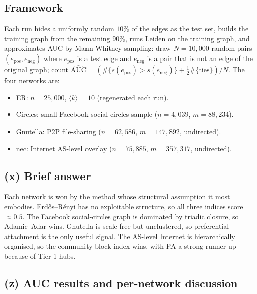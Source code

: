 \documentclass[12pt]{article}
\theoremstyle{definition}
\begin{document}
\subsection*{Framework}

Each run hides a uniformly random $10\%$ of the edges as the test set, builds the training graph from the remaining $90\%$, runs Leiden on the training graph, and approximates AUC by Mann-Whitney sampling: draw $N = 10{,}000$ random pairs $(e_{\text{pos}}, e_{\text{neg}})$ where $e_{\text{pos}}$ is a test edge and $e_{\text{neg}}$ is a pair that is not an edge of the original graph; count $\hat{\mathrm{AUC}} = (\#\{s(e_{\text{pos}}) > s(e_{\text{neg}})\} + \tfrac{1}{2} \#\{\text{ties}\}) / N$. The four networks are:
\begin{itemize}
  \item ER: $n = 25{,}000$, $\langle k \rangle = 10$ (regenerated each run).
  \item Circles: small Facebook social-circles sample ($n = 4{,}039$, $m = 88{,}234$).
  \item Gnutella: P2P file-sharing ($n = 62{,}586$, $m = 147{,}892$, undirected).
  \item nec: Internet AS-level overlay ($n = 75{,}885$, $m = 357{,}317$, undirected).
\end{itemize}

\subsection*{(x) Brief answer}

Each network is won by the method whose structural assumption it most embodies. Erd\H{o}s--R\'enyi has no exploitable structure, so all three indices score $\approx 0.5$. The Facebook social-circles graph is dominated by triadic closure, so Adamic--Adar wins. Gnutella is scale-free but unclustered, so preferential attachment is the only useful signal. The AS-level Internet is hierarchically organised, so the community block index wins, with PA a strong runner-up because of Tier-1 hubs.

\subsection*{(z) AUC results and per-network discussion}
\end{document}
